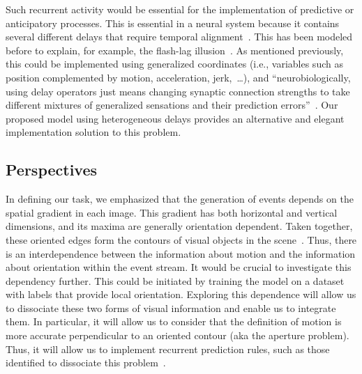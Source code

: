 \documentclass[default]{sn-jnl}%
\theoremstyle{thmstyleone}%
\theoremstyle{thmstyletwo}%
\theoremstyle{thmstylethree}%
\newcommand{\note}[1]{{\sethlcolor{yellow}\hl{#1}}}
\begin{document}
Such recurrent activity would be essential for the implementation of predictive or anticipatory processes. This is essential in a neural system because it contains several different delays that require temporal alignment~\citep{hogendoorn_predictive_2019}. This has been modeled before to explain, for example, the flash-lag illusion~\citep{khoei_flash-lag_2017}. %
As mentioned previously, this could be implemented using generalized coordinates (i.e., variables such as position complemented by motion, acceleration, jerk,~\ldots), and ``neurobiologically, using delay operators just means changing synaptic connection strengths to take different mixtures of generalized sensations and their prediction errors''~\citep{perrinet_active_2014}. Our proposed model using heterogeneous delays provides an alternative and elegant implementation solution to this problem.
\subsection{Perspectives}
In defining our task, we emphasized that the generation of events depends on the spatial gradient in each image. This gradient has both horizontal and vertical dimensions, and its maxima are generally orientation dependent. Taken together, these oriented edges form the contours of visual objects in the scene~\citep{koenderink_representation_1987}. Thus, there is an interdependence between the information about motion and the information about orientation within the event stream. It would be crucial to investigate this dependency further. This could be initiated by training the model on a dataset with labels that provide local orientation. %
Exploring this dependence will allow us to dissociate these two forms of visual information and enable us to integrate them. In particular, it will allow us to consider that the definition of motion is more accurate perpendicular to an oriented contour (aka the aperture problem). Thus, it will allow us to implement recurrent prediction rules, such as those identified to dissociate this problem~\citep{perrinet_motion-based_2012}.
\end{document}
